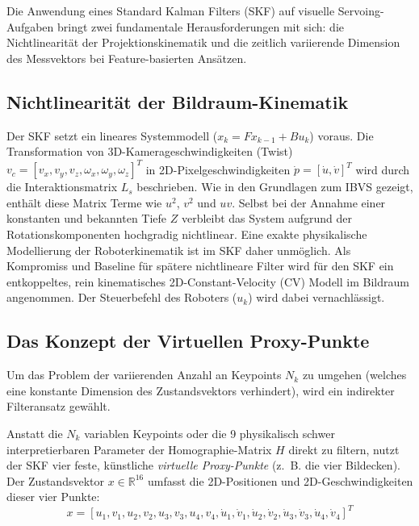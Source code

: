 \documentclass{article}
\begin{document}
Die Anwendung eines Standard Kalman Filters (SKF) auf visuelle Servoing-Aufgaben bringt zwei fundamentale Herausforderungen mit sich: die Nichtlinearität der Projektionskinematik und die zeitlich variierende Dimension des Messvektors bei Feature-basierten Ansätzen.




\subsection{Nichtlinearität der Bildraum-Kinematik}
Der SKF setzt ein lineares Systemmodell ($x_{k} = F x_{k-1} + B u_k$) voraus. Die Transformation von 3D-Kamerageschwindigkeiten (Twist) $v_c = [v_x, v_y, v_z, \omega_x, \omega_y, \omega_z]^T$ in 2D-Pixelgeschwindigkeiten $\dot{p} = [\dot{u}, \dot{v}]^T$ wird durch die Interaktionsmatrix $L_s$ beschrieben. Wie in den Grundlagen zum IBVS gezeigt, enthält diese Matrix Terme wie $u^2$, $v^2$ und $uv$. 
Selbst bei der Annahme einer konstanten und bekannten Tiefe $Z$ verbleibt das System aufgrund der Rotationskomponenten hochgradig nichtlinear. Eine exakte physikalische Modellierung der Roboterkinematik ist im SKF daher unmöglich. 
Als Kompromiss und Baseline für spätere nichtlineare Filter wird für den SKF ein entkoppeltes, rein kinematisches 2D-Constant-Velocity (CV) Modell im Bildraum angenommen. Der Steuerbefehl des Roboters ($u_k$) wird dabei vernachlässigt.




\subsection{Das Konzept der Virtuellen Proxy-Punkte}
Um das Problem der variierenden Anzahl an Keypoints $N_k$ zu umgehen (welches eine konstante Dimension des Zustandsvektors verhindert), wird ein indirekter Filteransatz gewählt. 

Anstatt die $N_k$ variablen Keypoints oder die 9 physikalisch schwer interpretierbaren Parameter der Homographie-Matrix $H$ direkt zu filtern, nutzt der SKF vier feste, künstliche \textit{virtuelle Proxy-Punkte} (z.~B. die vier Bildecken). 
Der Zustandsvektor $x \in \mathbb{R}^{16}$ umfasst die 2D-Positionen und 2D-Geschwindigkeiten dieser vier Punkte:
\begin{equation}
    x = [u_1, v_1, u_2, v_2, u_3, v_3, u_4, v_4, \dot{u}_1, \dot{v}_1, \dot{u}_2, \dot{v}_2, \dot{u}_3, \dot{v}_3, \dot{u}_4, \dot{v}_4]^T
\end{equation}
\end{document}
